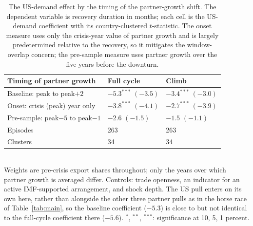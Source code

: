 \begin{table}[H]
\centering\small
\caption{The US-demand effect by the timing of the partner-growth shift. The dependent variable is recovery duration in months; each cell is the US-demand coefficient with its country-clustered $t$-statistic. The onset measure uses only the crisis-year value of partner growth and is largely predetermined relative to the recovery, so it mitigates the window-overlap concern; the pre-sample measure uses partner growth over the five years before the downturn.}
\label{tab:prewindow}
\begin{tabularx}{\textwidth}{@{}lYY@{}}
\toprule
Timing of partner growth & Full cycle & Climb \\ \midrule
Baseline: peak to peak$+2$ & $-5.3^{***}$ {\scriptsize$(-3.5)$} & $-3.4^{***}$ {\scriptsize$(-3.0)$} \\
Onset: crisis (peak) year only & $-3.8^{***}$ {\scriptsize$(-4.1)$} & $-2.7^{***}$ {\scriptsize$(-3.9)$} \\
Pre-sample: peak$-5$ to peak$-1$ & $-2.6$ {\scriptsize$(-1.5)$} & $-1.5$ {\scriptsize$(-1.1)$} \\
\midrule
Episodes & 263 & 263 \\
Clusters & 34 & 34 \\
\bottomrule
\end{tabularx}
\\[2pt]\footnotesize{Weights are pre-crisis export shares throughout; only the years over which partner growth is averaged differ. Controls: trade openness, an indicator for an active IMF-supported arrangement, and shock depth. The US pull enters on its own here, rather than alongside the other three partner pulls as in the horse race of Table~\ref{tab:main}, so the baseline coefficient ($-5.3$) is close to but not identical to the full-cycle coefficient there ($-5.6$). $^{*}$, $^{**}$, $^{***}$: significance at 10, 5, 1 percent.}
\end{table}

